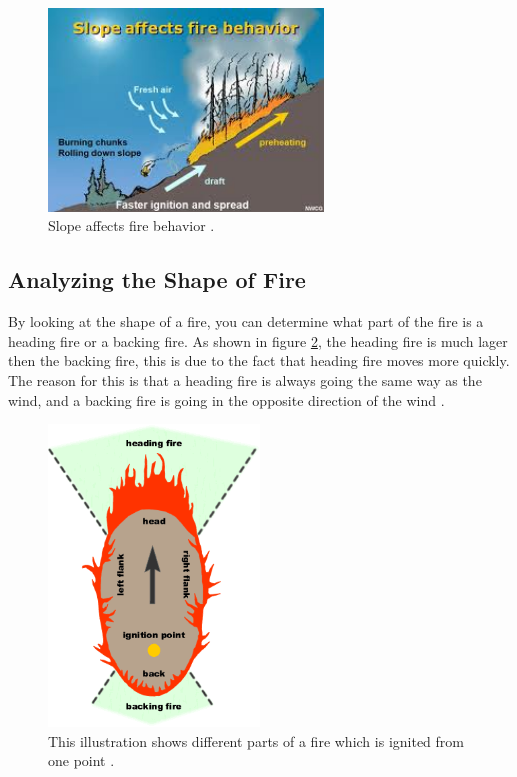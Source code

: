 \begin{figure}[here]
  \centering
      \includegraphics[width=0.65\textwidth]{theory/graphics/fire-slope.jpg}
  \caption{Slope affects fire behavior \cite{fireslope}.}
  \label{fig:fire-slope}
\end{figure}


\subsection{Analyzing the Shape of Fire}
By looking at the shape of a fire, you can determine what part of the fire is a heading fire or a backing fire. As shown in figure \ref{fig:fire-ignition}, the heading fire is much lager then the backing fire, this is due to the fact that heading fire moves more quickly. The reason for this is that a heading fire is always going the same way as the wind, and a backing fire is going in the opposite direction of the wind \cite{firebev}.

\begin{figure}[here]
  \centering
      \includegraphics[width=0.5\textwidth]{theory/graphics/fire-ignition.png}
  \caption{ This illustration shows different parts of a fire which is ignited from one point \cite{firebev}.}
  \label{fig:fire-ignition}
\end{figure}


